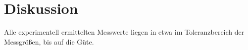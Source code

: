 \section{Diskussion}
\label{sec:Diskussion}
Alle experimentell ermittelten Messwerte liegen in etwa im Toleranzbereich der Messgrößen, bis auf die Güte.
